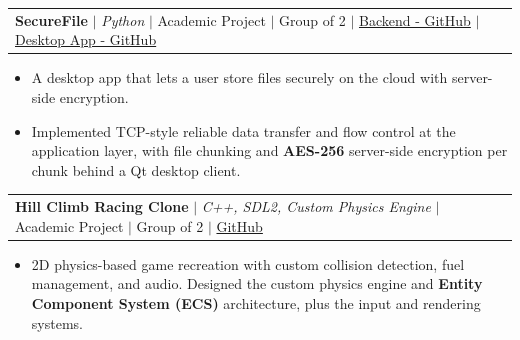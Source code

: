 \documentclass[a4paper,11pt]{article}
\makeatletter
\newcommand{\resumeItem}[1]{
  \item\small{\justifying #1 \vspace{-2pt}}
}
\newcommand{\resumeProjectHeading}[2]{
  \vspace{-2pt}\item
    \begin{tabular*}{0.97\textwidth}{l@{\extracolsep{\fill}}r}
      \small#1 & #2 \\
    \end{tabular*}\vspace{-7pt}
}
\newcommand{\resumeItemListStart}{\begin{itemize}[leftmargin=0.2in]}
\newcommand{\resumeItemListEnd}{\end{itemize}\vspace{-5pt}}
\makeatother
\begin{document}
\resumeProjectHeading
  {\textbf{SecureFile} $|$ \emph{Python} $|$ Academic Project $|$ Group of 2 $|$ \href{https://github.com/mithunvoe/networking-project-backend}{Backend - GitHub} $|$ \href{https://github.com/ninadgns/networking-project-frontend}{Desktop App - GitHub} }{}
  \resumeItemListStart
    \resumeItem{A desktop app that lets a user store files securely on the cloud with server-side encryption.}
    \resumeItem{Implemented TCP-style reliable data transfer and flow control at the application layer, with file chunking and \textbf{AES-256} server-side encryption per chunk behind a Qt desktop client.}
  \resumeItemListEnd
  


\resumeProjectHeading
  {\textbf{Hill Climb Racing Clone} $|$ \emph{C++, SDL2, Custom Physics Engine} $|$ Academic Project $|$ Group of 2 $|$ \href{https://github.com/mithunvoe/Hill-Climb-Racing}{\color{blue}GitHub}}{}
  \resumeItemListStart
    \resumeItem{2D physics-based game recreation with custom collision detection, fuel management, and audio. Designed the custom physics engine and \textbf{Entity Component System (ECS)} architecture, plus the input and rendering systems.}
  \resumeItemListEnd
\end{document}
